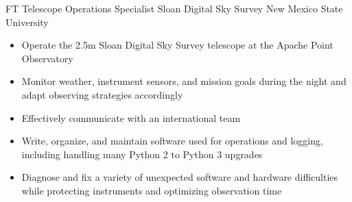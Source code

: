    {FT} %
    {Telescope Operations Specialist} %
    {Sloan Digital Sky Survey} %
    {New Mexico State University}
    {\begin{itemize}
    \setlength\itemsep{0.1em} 
        \item Operate the 2.5m Sloan Digital Sky Survey telescope at the Apache
            Point Observatory
        \item Monitor weather, instrument sensors, and mission goals during the
            night and adapt observing strategies accordingly
        \item Effectively communicate with an international team
        \item Write, organize, and maintain software used
            for operations and logging, including handling many Python 2 to
            Python 3 upgrades
        \item Diagnose and fix a variety of unexpected software and hardware
            difficulties while protecting instruments and optimizing observation
            time
    \end{itemize}
}
